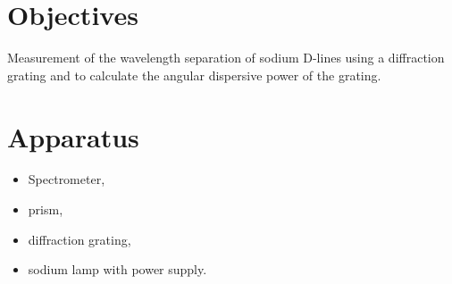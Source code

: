 \section{Objectives}
	Measurement of the wavelength separation of sodium D-lines using a diffraction grating and to calculate the angular dispersive power of the grating.

\section{Apparatus}
	\begin{itemize}
		\item  Spectrometer,
		\item  prism,
		\item  diffraction grating,
		\item  sodium lamp with power supply. 
	\end{itemize}
	



	
